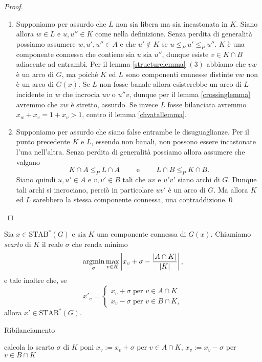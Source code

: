 \begin{proof}
	\begin{enumerate}
		\item Supponiamo per assurdo che \(L\) non sia libera ma sia incastonata in \(K\). Siano allora \(w\in L\) e \(u,u''\in K\) come nella definizione. Senza perdita di generalità possiamo assumere \(w,u',u''\in A\) e che \(u'\not\in K\) se \(u\le_{P}u'\le_{P}u''\). \(K\) \`e una componente connessa che contiene sia \(u\) sia \(u''\), dunque esiste \(v\in K\cap B\) adiacente ad entrambi. Per il lemma \ref{structurelemma} \((3)\) abbiamo che \(vw\) \`e un arco di \(G\), ma poich\'e \(K\) ed \(L\) sono componenti connesse distinte \(vw\) non \`e un arco di \(G(x)\). Se \(L\) non fosse banale allora esisterebbe un arco di \(L\) incidente in \(w\) che incrocia \(uv\) o \(u''v\), dunque per il lemma \ref{crossinglemma} avremmo che \(vw\) \`e stretto, assurdo. Se invece \(L\) fosse bilanciata avremmo \(x_w+x_v=1+x_v>1\), contro il lemma \ref{chvatallemma}. 
		\item Supponiamo per assurdo che siano false entrambe le disuguaglianze. Per il punto precedente \(K\) e \(L\), essendo non banali, non possono essere incastonate l'una nell'altra. Senza perdita di generalità possiamo allora assumere che valgano
		\[K\cap A\le_{P}L\cap A\qquad\text{ e }\qquad L\cap B\le_{P}K\cap B.\]
		Siano quindi \(u,u'\in A\) e \(v,v'\in B\) tali che \(uv\) e \(u'v'\) siano archi di \(G\). Dunque tali archi si incrociano, perciò in particolare \(uv'\) è un arco di \(G\). Ma allora \(K\) ed \(L\) sarebbero la stessa componente connessa, una contraddizione.\qed 
	\end{enumerate}
\end{proof}
\begin{definition}
	Sia \(x\in \text{STAB}^*(G)\) e sia \(K\) una componente connessa di \(G(x)\). Chiamiamo \emph{scarto} di \(K\) il reale \(\sigma\) che renda minimo
	\[\operatorname*{\arg\!\min}_{\sigma}\max_{v\in K}\left|x_v+\sigma-\frac{|A\cap K|}{|K|}\right|,\]
	e tale inoltre che, se
	\[ x'_v = 
	\begin{cases}
		x_v + \sigma \text{ per } v\in A\cap K\\
		x_v - \sigma \text{ per } v\in B\cap K, 
	\end{cases}
	\]
	allora \(x'\in \text{STAB}^*(G)\). 
\end{definition}
\begin{algorithm}
	\caption{Ribilanciamento} \label{rebalance} 
	\begin{algorithmic}
		[1]  \STATE calcola lo scarto \(\sigma\) di \(K\) \STATE poni \(x_v := x_v+\sigma\) per \(v\in A\cap K\), \(x_v := x_v-\sigma\) per \(v\in B\cap K\)\ENDWHILE
	\end{algorithmic}
\end{algorithm}
